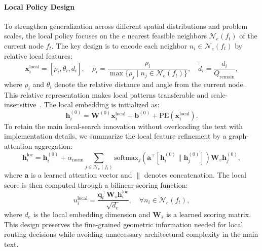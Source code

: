 \documentclass[preprint,12pt,authoryear]{elsarticle}
\theoremstyle{definition}
\begin{document}
\paragraph{Local Policy Design}
To strengthen generalization across different spatial distributions and problem scales, the local policy focuses on the $e$ nearest feasible neighbors $\mathcal{N}_e(f_t)$ of the current node $f_t$. The key design is to encode each neighbor $n_i \in \mathcal{N}_e(f_t)$ by relative local features:
\begin{equation}
\mathbf{x}_i^{\text{local}} = [\tilde{\rho}_i, \theta_i, \tilde{d}_i],
\quad
\tilde{\rho}_i = \frac{\rho_i}{\max\{\rho_j \mid n_j \in \mathcal{N}_e(f_t)\}},
\quad
\tilde{d}_i = \frac{d_i}{Q_{\text{remain}}},
\end{equation}
where $\rho_i$ and $\theta_i$ denote the relative distance and angle from the current node. This relative representation makes local patterns transferable and scale-insensitive~\citep{gao2023towards}. The local embedding is initialized as:
\begin{equation}
\mathbf{h}_i^{(0)} = \mathbf{W}^{(0)}\mathbf{x}_i^{\text{local}} + \mathbf{b}^{(0)} + \text{PE}(\mathbf{x}_i^{\text{local}}).
\end{equation}
To retain the main local-search innovation without overloading the text with implementation details, we summarize the local feature refinement by a graph-attention aggregation:
\begin{equation}
\mathbf{h}_i^{\text{loc}} = \mathbf{h}_i^{(0)} + \alpha_{\text{norm}} \sum_{j \in \mathcal{N}_e(f_t)} 
\text{softmax}_j\!\left(\mathbf{a}^{\top}[\mathbf{h}_i^{(0)} \| \mathbf{h}_j^{(0)}]\right)\mathbf{W}_v \mathbf{h}_j^{(0)},
\end{equation}
where $\mathbf{a}$ is a learned attention vector and $\|$ denotes concatenation. The local score is then computed through a bilinear scoring function:
\begin{equation}
u_i^{\text{local}} =
\frac{\mathbf{q}_t^{\top}\mathbf{W}_s\mathbf{h}_i^{\text{loc}}}{\sqrt{d_e}},
\quad \forall n_i \in \mathcal{N}_e(f_t),
\end{equation}
where $d_e$ is the local embedding dimension and $\mathbf{W}_s$ is a learned scoring matrix. This design preserves the fine-grained geometric information needed for local routing decisions while avoiding unnecessary architectural complexity in the main text.
\end{document}
